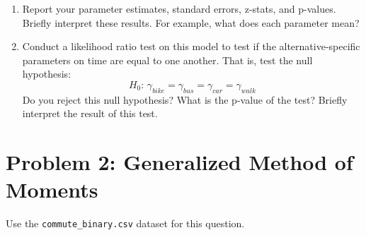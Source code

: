 \documentclass[11pt,letterpaper]{article}
\begin{document}
\begin{enumerate}[label=\alph*., leftmargin=*]
	\begin{enumerate}[label=\roman*.]
		\item Report your parameter estimates, standard errors, z-stats, and p-values. Briefly interpret these results. For example, what does each parameter mean?

		\item Conduct a likelihood ratio test on this model to test if the alternative-specific parameters on time are equal to one another. That is, test the null hypothesis:
		$$H_0 \text{: } \gamma_{bike} = \gamma_{bus} = \gamma_{car} = \gamma_{walk}$$
		Do you reject this null hypothesis? What is the p-value of the test? Briefly interpret the result of this test.
	\end{enumerate}
\end{enumerate}

\section*{Problem 2: Generalized Method of Moments}

Use the \texttt{commute\_binary.csv} dataset for this question.
\end{document}
